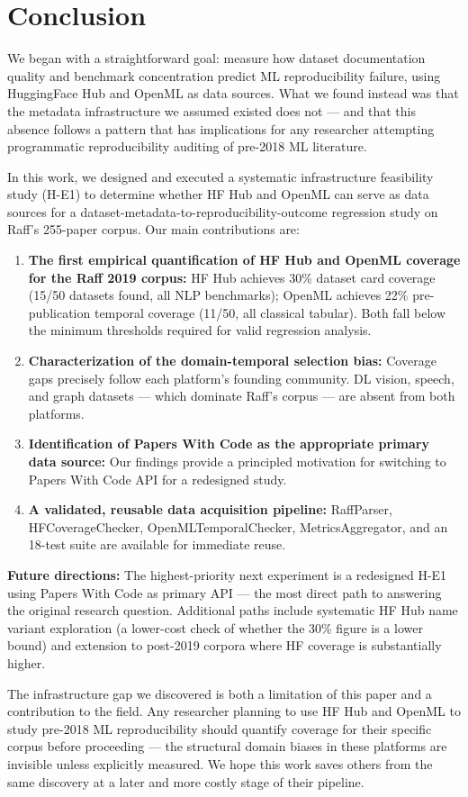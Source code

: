 \section{Conclusion}
\label{sec:conclusion}

We began with a straightforward goal: measure how dataset documentation quality and benchmark concentration predict ML reproducibility failure, using HuggingFace Hub and OpenML as data sources. What we found instead was that the metadata infrastructure we assumed existed does not --- and that this absence follows a pattern that has implications for any researcher attempting programmatic reproducibility auditing of pre-2018 ML literature.

In this work, we designed and executed a systematic infrastructure feasibility study (H-E1) to determine whether HF Hub and OpenML can serve as data sources for a dataset-metadata-to-reproducibility-outcome regression study on Raff's 255-paper corpus. Our main contributions are:

\begin{enumerate}
  \item \textbf{The first empirical quantification of HF Hub and OpenML coverage for the Raff 2019 corpus:} HF Hub achieves 30\% dataset card coverage (15/50 datasets found, all NLP benchmarks); OpenML achieves 22\% pre-publication temporal coverage (11/50, all classical tabular). Both fall below the minimum thresholds required for valid regression analysis.

  \item \textbf{Characterization of the domain-temporal selection bias:} Coverage gaps precisely follow each platform's founding community. DL vision, speech, and graph datasets --- which dominate Raff's corpus --- are absent from both platforms.

  \item \textbf{Identification of Papers With Code as the appropriate primary data source:} Our findings provide a principled motivation for switching to Papers With Code API for a redesigned study.

  \item \textbf{A validated, reusable data acquisition pipeline:} RaffParser, HFCoverageChecker, OpenMLTemporalChecker, MetricsAggregator, and an 18-test suite are available for immediate reuse.
\end{enumerate}

\textbf{Future directions:} The highest-priority next experiment is a redesigned H-E1 using Papers With Code as primary API --- the most direct path to answering the original research question. Additional paths include systematic HF Hub name variant exploration (a lower-cost check of whether the 30\% figure is a lower bound) and extension to post-2019 corpora where HF coverage is substantially higher.

The infrastructure gap we discovered is both a limitation of this paper and a contribution to the field. Any researcher planning to use HF Hub and OpenML to study pre-2018 ML reproducibility should quantify coverage for their specific corpus before proceeding --- the structural domain biases in these platforms are invisible unless explicitly measured. We hope this work saves others from the same discovery at a later and more costly stage of their pipeline.
